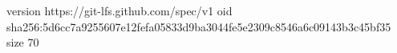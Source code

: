 version https://git-lfs.github.com/spec/v1
oid sha256:5d6cc7a9255607e12fefa05833d9ba3044fe5e2309c8546a6c09143b3c45bf35
size 70
